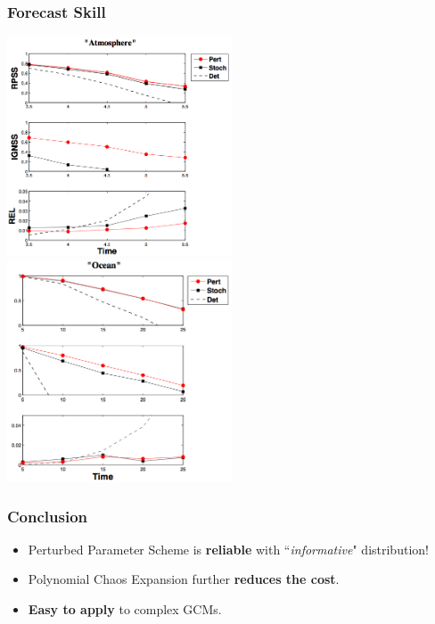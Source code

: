\documentclass[graphics]{beamer}
\begin{document}
\begin{frame}%
   \frametitle{Forecast Skill}
   \includegraphics[width=0.5\textwidth, height=0.65\textwidth]{timeseries_eclim_stoch_det_std00_lev8_40pt_meanao_exp1_atm.png}
   \includegraphics[width=0.5\textwidth, height=0.65\textwidth]{timeseries_eclim_stoch_det_std00_lev8_40pt_meanao_exp1_ocn.png}
\end{frame}

\begin{frame}
   \frametitle{Conclusion}
	\begin{itemize}
           \item {Perturbed Parameter Scheme} is {\bf reliable} with ``\emph{informative}" distribution! \\
		\vspace{12pt}
	   \item Polynomial Chaos Expansion further {\bf reduces the cost}. \\ %
		\vspace{12pt}
	   \item {\bf Easy to apply} to complex GCMs.
	\end{itemize}
\end{frame}
\end{document}
